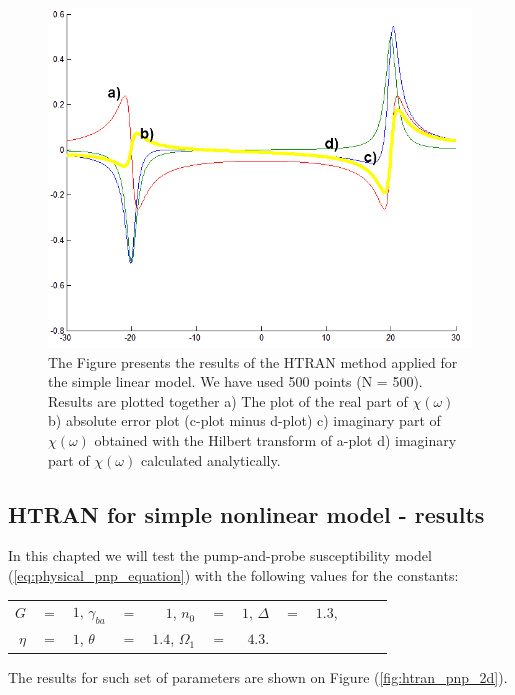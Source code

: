 \documentclass[12pt,twoside,a4paper]{article}
\numberwithin{equation}{subsection}
\numberwithin{figure}{subsection}
\begin{document}
\begin{figure} 
  \includegraphics[width=150mm]{img/htran_lin.png}
  \caption{The Figure presents the results of the HTRAN method applied for the simple linear model. We have used 500 points (N = 500). Results are plotted together 
   a) The plot of the real part of $\chi (\omega )$ 
   b) absolute error plot (c-plot minus d-plot) 
   c) imaginary part of $\chi (\omega )$ obtained with the Hilbert transform of a-plot 
   d) imaginary part of $\chi (\omega )$ calculated analytically. \label{eq:htran_lin}
  }
\end{figure}

\subsection{HTRAN for simple nonlinear model - results} \label{chap:htran_nlo}

In this chapted we will test the pump-and-probe susceptibility model (\ref{eq:physical_pnp_equation}) with the following values for the constants:

\begin{tabular}{r r l r r l r r l r r l}
  $G$           & $=$ & $1$, 
  $\gamma_{ba}$ & $=$ & $1$, 
  $n_0$         & $=$ & $1$, 
  $\Delta$      & $=$ & $1.3$, \\
  $\eta$        & $=$ & $1$, 
  $\theta$      & $=$ & $1.4$, 
  $\Omega_{1}$  & $=$ & $4.3$. \\
\end{tabular}

The results for such set of parameters are shown on Figure (\ref{fig:htran_pnp_2d}).
\end{document}
